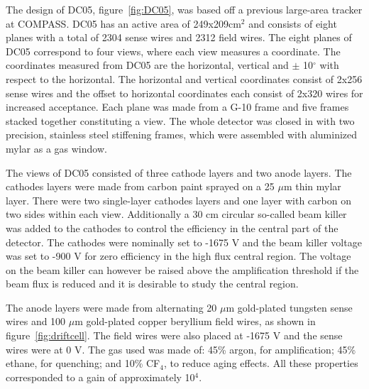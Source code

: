 The design of DC05, figure~\ref{fig:DC05}, was based off a previous large-area
tracker at COMPASS.  DC05 has an active area of 249x209cm$^2$ and consists of
eight planes with a total of 2304 sense wires and 2312 field wires.  The eight
planes of DC05 correspond to four views, where each view measures a coordinate.
The coordinates measured from DC05 are the horizontal, vertical and $\pm$
10$^{\circ}$ with respect to the horizontal.  The horizontal and vertical
coordinates consist of 2x256 sense wires and the offset to horizontal
coordinates each consist of 2x320 wires for increased acceptance.  Each plane
was made from a G-10 frame and five frames stacked together constituting a view.
The whole detector was closed in with two precision, stainless steel stiffening
frames, which were assembled with aluminized mylar as a gas window. \par The
views of DC05 consisted of three cathode layers and two anode layers.  The
cathodes layers were made from carbon paint sprayed on a 25 $\mu$m thin mylar
layer.  There were two single-layer cathodes layers and one layer with carbon on
two sides within each view.  Additionally a 30 cm circular so-called beam killer
was added to the cathodes to control the efficiency in the central part of the
detector.  The cathodes were nominally set to -1675 V and the beam killer
voltage was set to -900 V for zero efficiency in the high flux central region.
The voltage on the beam killer can however be raised above the amplification
threshold if the beam flux is reduced and it is desirable to study the central
region.  \par The anode layers were made from alternating 20 $\mu$m gold-plated
tungsten sense wires and 100 $\mu$m gold-plated copper beryllium field wires, as
shown in figure~\ref{fig:driftcell}.  The field wires were also placed at -1675
V and the sense wires were at 0 V.  The gas used was made of: 45\% argon, for
amplification; 45\% ethane, for quenching; and 10\% CF$_4$, to reduce aging
effects.  All these properties corresponded to a gain of approximately 10$^4$.


